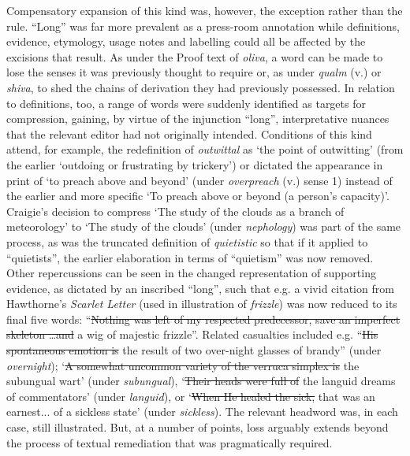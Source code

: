 \documentclass[output=paper,colorlinks,citecolor=brown,arabicfont,chinesefont]{langscibook}
\begin{document}
Compensatory expansion of this kind was, however, the exception rather than the rule. “Long” was far more prevalent as a press-room annotation while definitions, evidence, etymology, usage notes and labelling could all be affected by the excisions that result. As under the Proof text of \emph{oliva}, a word can be made to lose the senses it was previously thought to require or, as under \emph{qualm} (v.) or \emph{shiva}, to shed the chains of derivation they had previously possessed. In relation to definitions, too, a range of words were suddenly identified as targets for compression, gaining, by virtue of the injunction “long”, interpretative nuances that the relevant editor had not originally intended. Conditions of this kind attend, for example, the redefinition of \emph{outwittal} as ‘the point of outwitting’ (from the earlier ‘outdoing or frustrating by trickery’) or dictated the appearance in print of ‘to preach above and beyond’ (under \emph{overpreach} (v.) sense 1) instead of the earlier and more specific ‘To preach above or beyond (a person’s capacity)’. Craigie’s decision to compress ‘The study of the clouds as a branch of meteorology’ to ‘The study of the clouds’ (under \emph{nephology}) was part of the same process, as was the truncated definition of \emph{quietistic} so that if it applied to “quietists”, the earlier elaboration in terms of “quietism” was now removed. Other repercussions can be seen in the changed representation of supporting evidence, as dictated by an inscribed “long”, such that e.g. a vivid citation from Hawthorne’s \emph{Scarlet Letter} (used in illustration of \emph{frizzle}) was now reduced to its final five words: “\sout{Nothing was left of my respected predecessor, save an imperfect skeleton …and} a wig of majestic frizzle”. Related casualties included e.g. “\sout{His spontaneous emotion is} the result of two over-night glasses of brandy” (under \emph{overnight}); ‘\sout{A somewhat uncommon variety of the verruca simplex is} the subungual wart’ (under \emph{subungual}), ‘\sout{Their heads were full of} the languid dreams of commentators’ (under \emph{languid}), or ‘\sout{When He healed the sick,} that was an earnest...  of a sickless state’ (under \emph{sickless}). The relevant headword was, in each case, still illustrated. But, at a number of points,  loss arguably extends beyond the process of textual remediation that was pragmatically required. 
\end{document}

